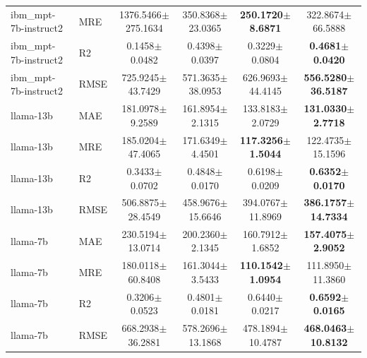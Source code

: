 \begin{table}[t]
\begin{tabular}{llcccc}
ibm\_mpt-7b-instruct2 & MRE & 1376.5466$\pm$275.1634 & 350.8368$\pm$23.0365 & \textbf{250.1720$\pm$8.6871} & 322.8674$\pm$66.5888 \\
ibm\_mpt-7b-instruct2 & R2 & 0.1458$\pm$0.0482 & 0.4398$\pm$0.0397 & 0.3229$\pm$0.0804 & \textbf{0.4681$\pm$0.0420} \\
ibm\_mpt-7b-instruct2 & RMSE & 725.9245$\pm$43.7429 & 571.3635$\pm$38.0953 & 626.9693$\pm$44.4145 & \textbf{556.5280$\pm$36.5187} \\
\addlinespace
llama-13b & MAE & 181.0978$\pm$9.2589 & 161.8954$\pm$2.1315 & 133.8183$\pm$2.0729 & \textbf{131.0330$\pm$2.7718} \\
llama-13b & MRE & 185.0204$\pm$47.4065 & 171.6349$\pm$4.4501 & \textbf{117.3256$\pm$1.5044} & 122.4735$\pm$15.1596 \\
llama-13b & R2 & 0.3433$\pm$0.0702 & 0.4848$\pm$0.0170 & 0.6198$\pm$0.0209 & \textbf{0.6352$\pm$0.0170} \\
llama-13b & RMSE & 506.8875$\pm$28.4549 & 458.9676$\pm$15.6646 & 394.0767$\pm$11.8969 & \textbf{386.1757$\pm$14.7334} \\
\addlinespace
llama-7b & MAE & 230.5194$\pm$13.0714 & 200.2360$\pm$2.1345 & 160.7912$\pm$1.6852 & \textbf{157.4075$\pm$2.9052} \\
llama-7b & MRE & 180.0118$\pm$60.8408 & 161.3044$\pm$3.5433 & \textbf{110.1542$\pm$1.0954} & 111.8950$\pm$11.3860 \\
llama-7b & R2 & 0.3206$\pm$0.0523 & 0.4801$\pm$0.0181 & 0.6440$\pm$0.0217 & \textbf{0.6592$\pm$0.0165} \\
llama-7b & RMSE & 668.2938$\pm$36.2881 & 578.2696$\pm$13.1868 & 478.1894$\pm$10.4787 & \textbf{468.0463$\pm$10.8132} \\
\bottomrule
\end{tabular}
\end{table}